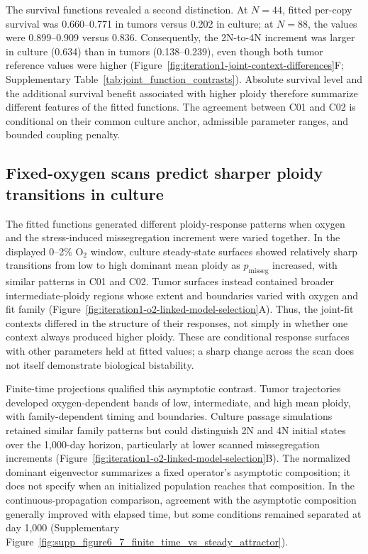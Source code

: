 \documentclass[11pt]{article}
\begin{document}
The survival functions revealed a second distinction. At $N=44$, fitted per-copy survival was 0.660--0.771 in tumors versus 0.202 in culture; at $N=88$, the values were 0.899--0.909 versus 0.836. Consequently, the 2N-to-4N increment was larger in culture (0.634) than in tumors (0.138--0.239), even though both tumor reference values were higher (Figure~\ref{fig:iteration1-joint-context-differences}F; Supplementary Table~\ref{tab:joint_function_contrasts}). Absolute survival level and the additional survival benefit associated with higher ploidy therefore summarize different features of the fitted functions. The agreement between C01 and C02 is conditional on their common culture anchor, admissible parameter ranges, and bounded coupling penalty.

\subsection*{Fixed-oxygen scans predict sharper ploidy transitions in culture}

The fitted functions generated different ploidy-response patterns when oxygen and the stress-induced missegregation increment were varied together. In the displayed 0--2\% O$_2$ window, culture steady-state surfaces showed relatively sharp transitions from low to high dominant mean ploidy as $p_{\mathrm{misseg}}$ increased, with similar patterns in C01 and C02. Tumor surfaces instead contained broader intermediate-ploidy regions whose extent and boundaries varied with oxygen and fit family (Figure~\ref{fig:iteration1-o2-linked-model-selection}A). Thus, the joint-fit contexts differed in the structure of their responses, not simply in whether one context always produced higher ploidy. These are conditional response surfaces with other parameters held at fitted values; a sharp change across the scan does not itself demonstrate biological bistability.

Finite-time projections qualified this asymptotic contrast. Tumor trajectories developed oxygen-dependent bands of low, intermediate, and high mean ploidy, with family-dependent timing and boundaries. Culture passage simulations retained similar family patterns but could distinguish 2N and 4N initial states over the 1,000-day horizon, particularly at lower scanned missegregation increments (Figure~\ref{fig:iteration1-o2-linked-model-selection}B). The normalized dominant eigenvector summarizes a fixed operator's asymptotic composition; it does not specify when an initialized population reaches that composition. In the continuous-propagation comparison, agreement with the asymptotic composition generally improved with elapsed time, but some conditions remained separated at day 1,000 (Supplementary Figure~\ref{fig:supp_figure6_7_finite_time_vs_steady_attractor}).
\end{document}
